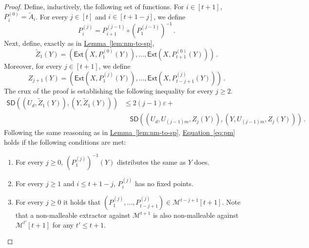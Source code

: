 \documentclass[11pt]{article}
\numberwithin{equation}{section}
\theoremstyle{definition}
\theoremstyle{plain}
\newcommand{\expref}[2]{\hyperref[#2]{#1~\ref{#2}}}
\newcommand{\expeqref}[2]{\hyperref[#2]{#1~\eqref{#2}}}
\newcommand{\ext}{\mathsf{Ext}}
\newcommand{\eps}{\varepsilon}
\def\SD{\ensuremath{\mathsf{SD}}}
\def\MM{{\mathcal{M}}}
\begin{document}
\begin{proof}
Define, inductively, the following set of functions. 
For $i \in [t+1]$, $P_i^{(0)} = \widetilde{A}_i$. For every
$j \in [t]$ and $i \in [t+1-j]$, we define
\begin{equation}\label{eq:composing perm}
P_i^{(j)} = P_{i+1}^{(j-1)} \circ \left( P_{1}^{(j-1)} \right)^{-1}\,.
\end{equation}
Next, define, exactly as in \expref{Lemma}{lem:nm-to-sp},
\[
\widetilde{Z}_1(Y) = \left( \ext\left(X,P_{1}^{(0)}(Y)\right),\ldots, \ext\left(X,P_{t+1}^{(0)}(Y)\right) \right)\,.
\]
Moreover, for every $j \in [t+1]$, we define
\[
Z_{j+1}(Y) = \left( \ext\left(X,P_{1}^{(j)}(Y)\right),\ldots, \ext\left(X,P_{t-j+1}^{(j)}(Y)\right)\right)\,.
\]
The crux of the proof is establishing the following inequality for every $j \ge 2$.
\begin{align}\label{eq:pm}
\SD((U_d,\widetilde{Z}_1(Y)),(Y,\widetilde{Z}_1(Y))) &\le 2(j-1)\eps + \nonumber \\
& ~~~~\SD((U_{d},U_{(j-1)m},Z_j(Y)),(Y,U_{(j-1)m},Z_{j}(Y)))\,.
\end{align}
Following the same reasoning as in \expref{Lemma}{lem:nm-to-sp}, \expeqref{Equation}{eq:pm} holds if the 
following conditions are met:
\begin{enumerate}
\item\label{it:pm1}	For every $j \ge 0$, $\left(P_{1}^{(j)}\right)^{-1}(Y)$ distributes the same as $Y$ does.
\item\label{it:pm2}	For every $j \ge 1$ and $i \le t+1-j$, $P_{i}^{(j)}$ has no fixed points.
\item\label{it:pm3}	For every $j \ge 0$ it holds that $( P_{1}^{(j)},\ldots,P_{t-j+1}^{(j)} ) \in \MM^{t-j+1}[t+1]$.
Note that a non-malleable extractor against $\MM^{t+1}$
is also non-malleable against $\MM^{t'}[t+1]$ for any $t' \le t+1$. 
\end{enumerate}


\end{proof}
\end{document}

